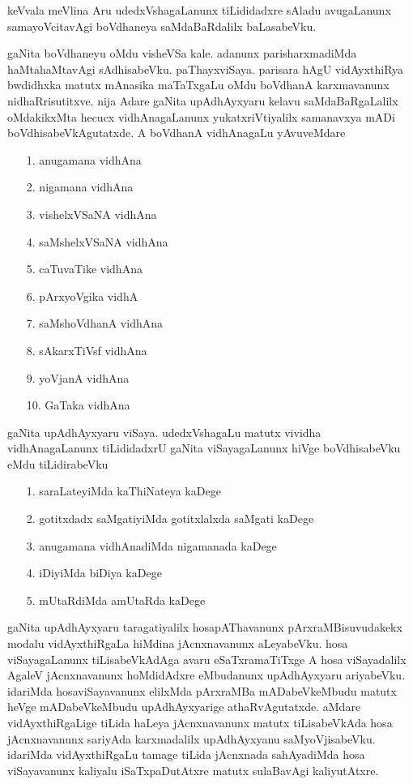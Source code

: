 keVvala meVlina Aru udedxVshagaLanunx tiLididadxre sAladu avugaLanunx samayoVcitavAgi boVdhaneya saMdaBaRdalilx baLasabeVku.

gaNita boVdhaneyu oMdu visheVSa kale. adanunx parisharxmadiMda haMtahaMtavAgi sAdhisabeVku. paThayxviSaya. parisara hAgU vidAyxthiRya bwdidhxka matutx mAnasika maTaTxgaLu oMdu boVdhanA karxmavanunx nidhaRrisutitxve. nija Adare gaNita upAdhAyxyaru kelavu saMdaBaRgaLalilx oMdakikxMta hecucx vidhAnagaLanunx yukatxriVtiyalilx samanavxya mADi boVdhisabeVkAgutatxde. A boVdhanA vidhAnagaLu yAvuveMdare
\begin{enumerate}
\item[{\rm 1.}] anugamana vidhAna
\item[{\rm 2.}] nigamana vidhAna
\item[{\rm 3.}] vishelxVSaNA vidhAna
\item[{\rm 4.}] saMshelxVSaNA vidhAna
\item[{\rm 5.}] caTuvaTike vidhAna
\item[{\rm 6.}] pArxyoVgika vidhA
\item[{\rm 7.}] saMshoVdhanA vidhAna
\item[{\rm 8.}] sAkarxTiVsf vidhAna
\item[{\rm 9.}] yoVjanA vidhAna
\item[{\rm 10.}] GaTaka vidhAna
\end{enumerate}

gaNita upAdhAyxyaru viSaya. udedxVshagaLu matutx vividha vidhAnagaLanunx tiLididadxrU gaNita viSayagaLanunx hiVge boVdhisabeVku eMdu tiLidirabeVku
\begin{enumerate}
\item[{\rm 1.}] saraLateyiMda kaThiNateya kaDege
\item[{\rm 2.}] gotitxdadx saMgatiyiMda gotitxlalxda saMgati kaDege
\item[{\rm 3.}] anugamana vidhAnadiMda nigamanada kaDege
\item[{\rm 4.}] iDiyiMda biDiya kaDege
\item[{\rm 5.}] mUtaRdiMda amUtaRda kaDege
\end{enumerate}

gaNita upAdhAyxyaru taragatiyalilx hosapAThavanunx pArxraMBisuvudakekx modalu vidAyxthiRgaLa hiMdina jAcnxnavanunx aLeyabeVku. hosa viSayagaLanunx tiLisabeVkAdAga avaru eSaTxramaTiTxge A hosa viSayadalilx AgaleV jAcnxnavanunx hoMdidAdxre eMbudanunx upAdhAyxyaru ariyabeVku. idariMda hosaviSayavanunx elilxMda pArxraMBa mADabeVkeMbudu matutx heVge mADabeVkeMbudu upAdhAyxyarige athaRvAgutatxde. aMdare vidAyxthiRgaLige tiLida haLeya jAcnxnavanunx matutx tiLisabeVkAda hosa jAcnxnavanunx sariyAda karxmadalilx upAdhAyxyanu saMyoVjisabeVku. idariMda vidAyxthiRgaLu tamage tiLida jAcnxnada sahAyadiMda hosa viSayavanunx kaliyalu iSaTxpaDutAtxre matutx sulaBavAgi kaliyutAtxre.

